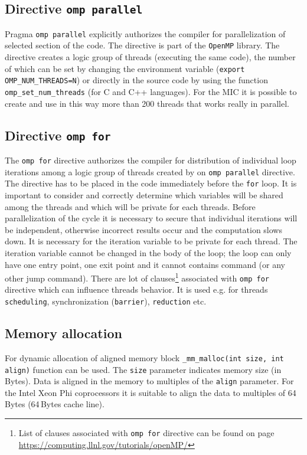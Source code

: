 \label{sec:omp_parallel}
\subsection{Directive \texttt{omp parallel}}
Pragma \texttt{omp parallel} explicitly authorizes the compiler for parallelization of selected section of the code. The directive is part of the \texttt{OpenMP} library. The directive creates a logic group of threads (executing the same code), the number of which can be set by changing the environment variable (\texttt{export OMP\_NUM\_THREADS=N}) or directly in the source code by using the function \texttt{omp\_set\_num\_threads} (for C and C++ languages). For the MIC it is possible to create and use in this way more than 200 threads that works really in parallel.

\label{sec:omp_for}
\subsection{Directive \texttt{omp for}}
The \texttt{omp for} directive authorizes the compiler for distribution of individual loop iterations among a logic group of threads created by on \texttt{omp parallel} directive. The directive has to be placed in the code immediately before the \texttt{for} loop. It is important to consider and correctly determine which variables will be shared among the threads and which will be private for each threads. Before parallelization of the cycle it is necessary to secure that individual iterations will be independent, otherwise incorrect results occur and the computation slows down. It is necessary for the iteration variable to be private for each thread. The iteration variable cannot be changed in the body of the loop; the loop can only have one entry point, one exit point and it cannot contains  command (or any other jump command). There are lot of clauses\footnote{List of clauses associated with \texttt{omp for} directive can be found on page
\url{https://computing.llnl.gov/tutorials/openMP/}} associated with \texttt{omp for} directive which can influence threads behavior. It is used e.g. for threads \texttt{scheduling}, synchronization (\texttt{barrier}), \texttt{reduction} etc.

\subsection{Memory allocation}
\label{sec:allocation}
For dynamic allocation of aligned memory block \texttt{\_mm\_malloc(int size, int align)} function can be used. The \texttt{size} parameter indicates memory size (in Bytes). Data is aligned in the memory to multiples of the \texttt{align} parameter. For the Intel Xeon Phi coprocessors it is suitable to align the data to multiples of 64\,Bytes (64\,Bytes cache line).

